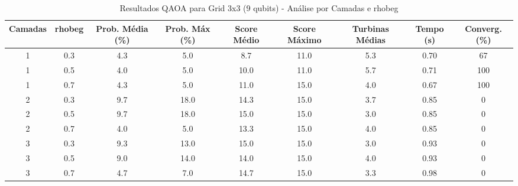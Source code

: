 \begin{table*}[htbp]
\centering
\caption{Resultados QAOA para Grid 3x3 (9 qubits) - Análise por Camadas e rhobeg}
\label{tab:resultados_3_3}
\footnotesize
\begin{tabular}{|c|c|c|c|c|c|c|c|c|}
\hline
\textbf{Camadas} & \textbf{rhobeg} & \textbf{Prob. Média (\%)} & \textbf{Prob. Máx (\%)} & \textbf{Score Médio} & \textbf{Score Máximo} & \textbf{Turbinas Médias} & \textbf{Tempo (s)} & \textbf{Converg. (\%)} \\
\hline
1 & 0.3 & 4.3 & 5.0 & 8.7 & 11.0 & 5.3 & 0.70 & 67 \\
1 & 0.5 & 4.0 & 5.0 & 10.0 & 11.0 & 5.7 & 0.71 & 100 \\
1 & 0.7 & 4.3 & 5.0 & 11.0 & 15.0 & 4.0 & 0.67 & 100 \\
2 & 0.3 & 9.7 & 18.0 & 14.3 & 15.0 & 3.7 & 0.85 & 0 \\
2 & 0.5 & 9.7 & 18.0 & 15.0 & 15.0 & 3.0 & 0.85 & 0 \\
2 & 0.7 & 4.0 & 5.0 & 13.3 & 15.0 & 4.0 & 0.85 & 0 \\
3 & 0.3 & 9.3 & 13.0 & 15.0 & 15.0 & 3.0 & 0.93 & 0 \\
3 & 0.5 & 9.0 & 14.0 & 14.0 & 15.0 & 4.0 & 0.93 & 0 \\
3 & 0.7 & 4.7 & 7.0 & 14.7 & 15.0 & 3.3 & 0.98 & 0 \\
\hline
\end{tabular}
\end{table*}